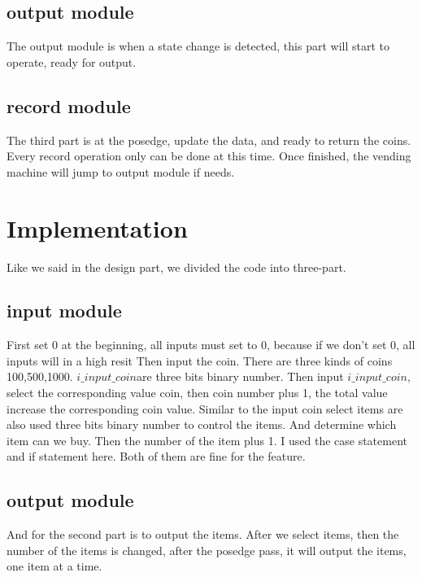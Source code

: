 \documentclass[12pt,a4paper]{article}
\begin{document}
\subsection{output module}
The output module is when a state change is detected, this part will start to operate, ready for output.

\subsection{record module}

The third part is at the posedge, update the data, and ready to return the coins. 
Every record operation only can be done at this time.
Once finished, the vending machine will jump to output module if needs.



\newpage

\section{Implementation}

Like we said in the design part, we divided the code into three-part.

\subsection{input module}

First set 0 at the beginning, all inputs must set to 0, because if we don't set 0, all inputs will in a high resit
Then input the coin. There are three kinds of coins 100,500,1000.
$i\_input\_coin $are three bits binary number. 
Then input $i\_input\_coin$, select the corresponding value coin, then coin number plus 1, the total value increase the corresponding coin value.
Similar to the input coin select items are also used three bits binary number to control the items. 
And determine which item can we buy.
Then the number of the item plus 1.
I used the case statement and if statement here.
Both of them are fine for the feature.

\subsection{output module}

And for the second part is to output the items. 
After we select items, then the number of the items is changed, after the posedge pass, it will output the items, one item at a time.
\end{document}

